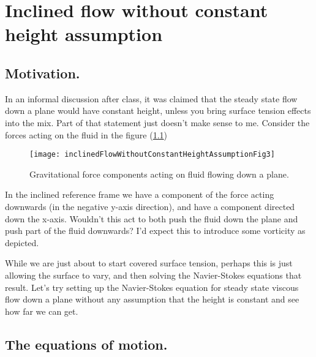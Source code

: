 
%

\chapter{Inclined flow without constant height assumption}
\label{chap:inclinedFlowWithoutConstantHeightAssumption}
{}
\date{Mar 6, 2012}

\beginArtWithToc

\section{Motivation.}

In an informal discussion after class, it was claimed that the steady state flow down a plane would have constant height, unless you bring surface tension effects into the mix.  Part of that statement just doesn't make sense to me.  Consider the forces acting on the fluid in the figure (\ref{fig:inclinedFlowWithoutConstantHeightAssumption:inclinedFlowWithoutConstantHeightAssumptionFig3})

\begin{figure}[htp]
   \centering
   \texttt{[image: inclinedFlowWithoutConstantHeightAssumptionFig3]}
   \caption{Gravitational force components acting on fluid flowing down a plane.}\label{fig:inclinedFlowWithoutConstantHeightAssumption:inclinedFlowWithoutConstantHeightAssumptionFig3}
\end{figure}

In the inclined reference frame we have a component of the force acting downwards (in the negative y-axis direction), and have a component directed down the x-axis.  Wouldn't this act to both push the fluid down the plane and push part of the fluid downwards?  I'd expect this to introduce some vorticity as depicted.

While we are just about to start covered surface tension, perhaps this is just allowing the surface to vary, and then solving the Navier-Stokes equations that result.  Let's try setting up the Navier-Stokes equation for steady state viscous flow down a plane without any assumption that the height is constant and see how far we can get.

\section{The equations of motion.}

